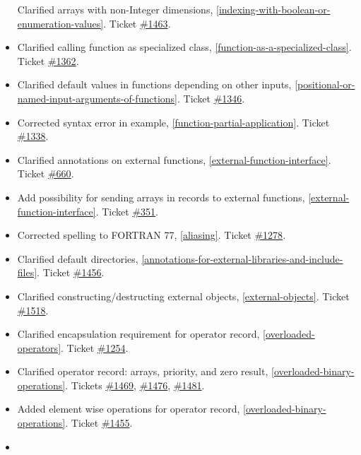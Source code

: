 \documentclass[10pt,a4paper]{report}
\begin{document}
\begin{itemize}
  Clarified arrays with non-Integer dimensions, \ref{indexing-with-boolean-or-enumeration-values}. Ticket
  \href{https://trac.modelica.org/Modelica/ticket/1463}{\#1463}.
\item
  Clarified calling function as specialized class, \ref{function-as-a-specialized-class}. Ticket
  \href{https://trac.modelica.org/Modelica/ticket/1362}{\#1362}.
\item
  Clarified default values in functions depending on other inputs,
  \ref{positional-or-named-input-arguments-of-functions}. Ticket
  \href{https://trac.modelica.org/Modelica/ticket/1346}{\#1346}.
\item
  Corrected syntax error in example, \ref{function-partial-application}. Ticket
  \href{https://trac.modelica.org/Modelica/ticket/1338}{\#1338}.
\item
  Clarified annotations on external functions, \ref{external-function-interface}. Ticket
  \href{https://trac.modelica.org/Modelica/ticket/660}{\#660}.
\item
  Add possibility for sending arrays in records to external functions,
  \ref{external-function-interface}. Ticket
  \href{https://trac.modelica.org/Modelica/ticket/351}{\#351}.
\item
  Corrected spelling to FORTRAN 77, \ref{aliasing}. Ticket
  \href{https://trac.modelica.org/Modelica/ticket/1278}{\#1278}.
\item
  Clarified default directories, \ref{annotations-for-external-libraries-and-include-files}. Ticket
  \href{https://trac.modelica.org/Modelica/ticket/1456}{\#1456}.
\item
  Clarified constructing/destructing external objects, \ref{external-objects}.
  Ticket \href{https://trac.modelica.org/Modelica/ticket/1518}{\#1518}.
\item
  Clarified encapsulation requirement for operator record, \ref{overloaded-operators}.
  Ticket \href{https://trac.modelica.org/Modelica/ticket/1254}{\#1254}.
\item
  Clarified operator record: arrays, priority, and zero result, 
  \ref{overloaded-binary-operations}. Tickets
  \href{https://trac.modelica.org/Modelica/ticket/1469}{\#1469},
  \href{https://trac.modelica.org/Modelica/ticket/1476}{\#1476},
  \href{https://trac.modelica.org/Modelica/ticket/1481}{\#1481}.
\item
  Added element wise operations for operator record, \ref{overloaded-binary-operations}.
  Ticket \href{https://trac.modelica.org/Modelica/ticket/1455}{\#1455}.
\item

\end{itemize}
\end{document}
